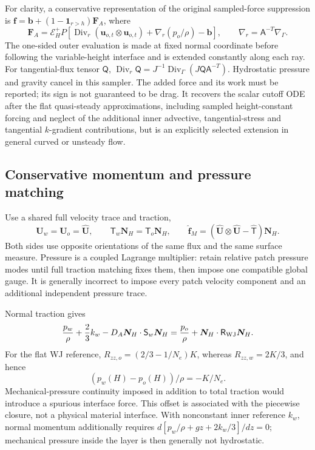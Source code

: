 \documentclass[11pt,a4paper]{article}
\numberwithin{equation}{section}
\begin{document}
For clarity, a conservative representation of the original sampled-force
suppression is $\bm f=\bm b+(1-\mathbf1_{r>h})\bm F_A$, where
\begin{equation}
 \bm F_A=\mathcal E_H^+P\left[
 \operatorname{Div}_r(\bm u_{o,t}\otimes\bm u_{o,t})
 +\nabla_r(p_o/\rho)-\bm b\right],\qquad
 \nabla_r=\mathsf A^{-T}\nabla_\Gamma.
 \label{eq:wj-wall-curved-force}
\end{equation}
The one-sided outer evaluation is made at fixed normal coordinate before
following the variable-height interface and is extended constantly along
each ray. For tangential-flux tensor $\mathsf Q$,
$\operatorname{Div}_r\mathsf Q=J^{-1}\operatorname{Div}_\Gamma
(J\mathsf Q\mathsf A^{-T})$. Hydrostatic pressure and gravity cancel
in this sampler. The added force and its work must be reported; its sign
is not guaranteed to be drag. It recovers the scalar cutoff ODE after the flat quasi-steady
approximations, including sampled height-constant forcing and neglect
of the additional inner advective, tangential-stress and tangential
$k$-gradient contributions, but is an explicitly
selected extension in general curved or unsteady flow.

\subsection{Conservative momentum and pressure matching}
Use a shared full velocity trace and traction,
\begin{equation}
 \bm U_w=\bm U_o=\widehat{\bm U},\qquad
 \mathsf T_w\bm N_H=\mathsf T_o\bm N_H,
 \qquad
 \widehat{\bm f}_M=(\widehat{\bm U}\otimes\widehat{\bm U}
                         -\widehat{\mathsf T})\bm N_H.
 \label{eq:wj-wall-matching}
\end{equation}
Both sides use opposite orientations of the same flux and the same surface
measure. Pressure is a coupled Lagrange multiplier: retain relative patch
pressure modes until full traction matching fixes them, then impose one
compatible global gauge. It is generally incorrect to impose every patch
velocity component and an additional independent pressure trace.

Normal traction gives
\begin{equation}
 \frac{p_w}{\rho}+\frac23k_w
 -D_A\bm N_H\cdot\mathsf S_w\bm N_H
 =\frac{p_o}{\rho}+\bm N_H\cdot\mathsf R_{\rm WJ}\bm N_H.
 \label{eq:wj-wall-normal-traction}
\end{equation}
For the flat WJ reference, $R_{zz,o}=(2/3-1/N_e)K$, whereas
$R_{zz,w}=2K/3$, and hence
\begin{equation}
 \boxed{(p_w(H)-p_o(H))/\rho=-K/N_e.}
 \label{eq:wj-wall-pressure-offset}
\end{equation}
Mechanical-pressure continuity imposed in addition to total traction
would introduce a spurious interface force. This offset is associated
with the piecewise closure, not a physical material interface. With
nonconstant inner reference $k_w$, normal momentum additionally requires
$d[p_w/\rho+gz+2k_w/3]/dz=0$; mechanical pressure inside the layer
is then generally not hydrostatic.
\end{document}
